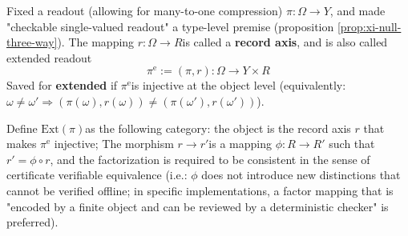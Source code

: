 \begin{definition}\label{def:xi-extension-preserving-category}
Fixed a readout (allowing for many-to-one compression) \(\pi:\Omega\to Y\), and made "checkable single-valued readout" a type-level premise (proposition \ref{prop:xi-null-three-way}).
The mapping \(r:\Omega\to R\) ​​is called a \textbf{record axis}, and is also called extended readout
\[
\pi^{\mathrm e}:=(\pi,r):\Omega\to Y\times R
\]
Saved for \textbf{extended} if \(\pi^{\mathrm e}\) ​​is injective at the object level (equivalently: \(\omega\neq\omega'\Rightarrow (\pi(\omega),r(\omega))\neq(\pi(\omega'),r(\omega'))\)).
\par
Define \(\mathrm{Ext}(\pi)\) ​​as the following category: the object is the record axis \(r\) that makes \(\pi^{\mathrm e}\) injective;
The morphism \(r\to r'\) ​​is a mapping \(\phi:R\to R'\) such that \(r'=\phi\circ r\), and the factorization is required to be consistent in the sense of certificate verifiable equivalence (i.e.: \(\phi\) does not introduce new distinctions that cannot be verified offline; in specific implementations, a factor mapping that is "encoded by a finite object and can be reviewed by a deterministic checker" is preferred).
\end{definition}

